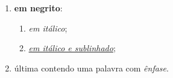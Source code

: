 \begin{enumerate}[label = {\alphsect}]
\begin{enumerate}[label = {\textendash}]
\end{enumerate}
\item \textbf{ em negrito}:
\begin{enumerate}[label = {\textendash}]
\item \textit{ em itálico};
\item \uline{\textit{ em itálico e sublinhado}};
\end{enumerate}
\item última  contendo uma palavra com \emph{ênfase}.
\end{enumerate}
